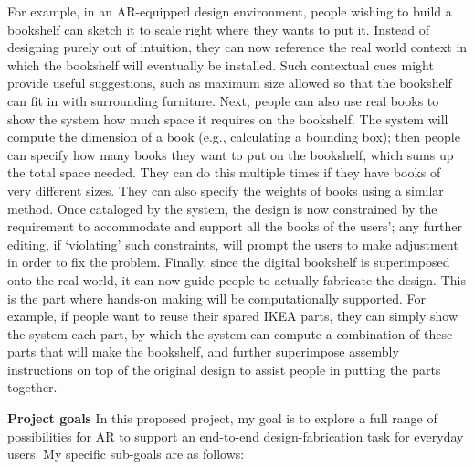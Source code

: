 For example, in an AR-equipped design environment, people wishing to build a bookshelf can sketch it to scale right where they wants to put it. Instead of designing purely out of intuition, they can now reference the real world context in which the bookshelf will eventually be installed. Such contextual cues might provide useful suggestions, such as maximum size allowed so that the bookshelf can fit in with surrounding furniture. Next, people can also use real books to show the system how much space it requires on the bookshelf. The system will compute the dimension of a book (e.g., calculating a bounding box); then people can specify how many books they want to put on the bookshelf, which sums up the total space needed. They can do this multiple times if they have books of very different sizes. They can also specify the weights of books using a similar method. Once cataloged by the system, the design is now constrained by the requirement to accommodate and support all the books of the users'; any further editing, if `violating' such constraints, will prompt the users to make adjustment in order to fix the problem. Finally, since the digital bookshelf is superimposed onto the real world, it can now guide people to actually fabricate the design. This is the part where hands-on making will be computationally supported. For example, if people want to reuse their spared IKEA parts, they can simply show the system each part, by which the system can compute a combination of these parts that will make the bookshelf, and further superimpose assembly instructions on top of the original design to assist people in putting the parts together.


\textbf{Project goals} In this proposed project, my goal is to explore a full range of possibilities for AR to support an end-to-end design-fabrication task for everyday users. My specific sub-goals are as follows:

